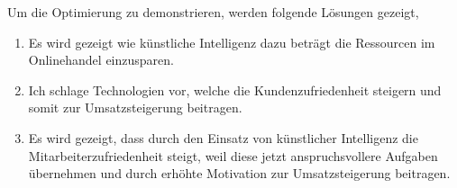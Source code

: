 Um die Optimierung zu demonstrieren, werden folgende Lösungen gezeigt,

\begin{enumerate}[label=(\arabic*)]
	\item Es wird gezeigt wie künstliche Intelligenz dazu beträgt die Ressourcen im Onlinehandel einzusparen.
	\item Ich schlage Technologien vor, welche die Kundenzufriedenheit steigern und somit zur Umsatzsteigerung beitragen.
	\item Es wird gezeigt, dass durch den Einsatz von künstlicher Intelligenz die Mitarbeiterzufriedenheit steigt, weil diese jetzt anspruchsvollere Aufgaben übernehmen und durch erhöhte Motivation zur Umsatzsteigerung beitragen.
\end{enumerate}